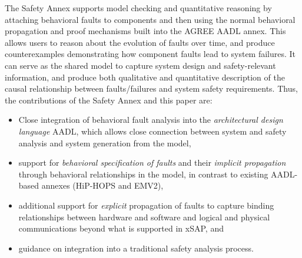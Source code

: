 The Safety Annex supports model checking and quantitative reasoning by attaching behavioral faults to components and then using the normal behavioral propagation and proof mechanisms built into the AGREE AADL annex. This allows users to reason about the evolution of faults over time, and produce counterexamples demonstrating how component faults lead to system failures. It can serve as the shared model to capture system design and safety-relevant information, and produce both qualitative and quantitative description of the causal relationship between faults/failures and system safety requirements.
%
Thus, the contributions of the Safety Annex and this paper are:
\begin{itemize}
\item Close integration of behavioral fault analysis into the {\em architectural design language} AADL, which allows close connection between system and safety analysis and system generation from the model,
\item support for {\em behavioral specification of faults} and their {\em implicit propagation} through behavioral relationships in the model, in contrast to existing AADL-based annexes (HiP-HOPS and EMV2),
\item additional support for {\em explicit} propagation of faults to capture binding relationships between hardware and software and logical and physical communications beyond what is supported in xSAP, and
\item guidance on integration into a traditional safety analysis process.
\end{itemize}
